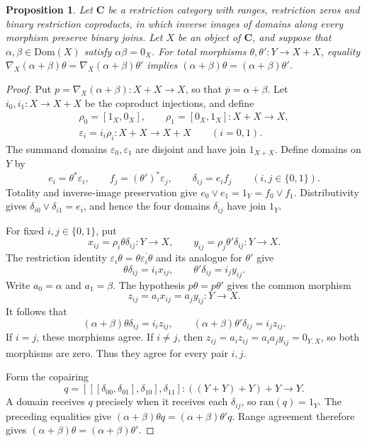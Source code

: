 \documentclass[letterpaper,10pt]{amsart}
\theoremstyle{plain}
\newtheorem{prop}{Proposition}[thm]
\theoremstyle{definition}
\newcommand{\rst}[1]{\overline{#1}}
\begin{document}
\begin{prop}\label{PropTotalCopMono}
Let $\mathbf C$ be a restriction category with ranges, restriction
zeros and binary restriction coproducts, in which inverse images of
domains along every morphism preserve binary joins. Let $X$ be an
object of $\mathbf C$, and suppose that $\alpha,\beta\in\mathrm{Dom}(X)$ satisfy $\alpha\beta=0_X$.
For total morphisms $\theta,\theta':Y\to X+X$, equality
$\nabla_X(\alpha+\beta)\theta=\nabla_X(\alpha+\beta)\theta'$
implies $(\alpha+\beta)\theta=(\alpha+\beta)\theta'$.
\end{prop}
\begin{proof}
Put $p=\nabla_X(\alpha+\beta):X+X\to X$, so that
$\rst p=\alpha+\beta$. Let $i_0,i_1:X\to X+X$ be the coproduct
injections, and define
\[
 \begin{gathered}
 \rho_0=[1_X,0_X],\qquad \rho_1=[0_X,1_X]:X+X\to X,\\
 \varepsilon_i=i_i\rho_i:X+X\to X+X\qquad(i=0,1).
 \end{gathered}
\]
The summand domains $\varepsilon_0,\varepsilon_1$ are disjoint
and have join $1_{X+X}$. Define domains on $Y$ by
\[
 e_i=\theta^*\varepsilon_i,\qquad
 f_j=(\theta')^*\varepsilon_j,\qquad
 \delta_{ij}=e_i f_j\qquad(i,j\in\{0,1\}).
\]
Totality and inverse-image preservation give
$e_0\vee e_1=1_Y=f_0\vee f_1$. Distributivity gives
$\delta_{i0}\vee\delta_{i1}=e_i$, and hence the four domains
$\delta_{ij}$ have join $1_Y$.

For fixed $i,j\in\{0,1\}$, put
\[
 x_{ij}=\rho_i\theta\delta_{ij}:Y\to X,
 \qquad y_{ij}=\rho_j\theta'\delta_{ij}:Y\to X.
\]
The restriction identity
$\varepsilon_i\theta=\theta\rst{\varepsilon_i\theta}$ and its
analogue for $\theta'$ give
\[
 \theta\delta_{ij}=i_i x_{ij},\qquad
 \theta'\delta_{ij}=i_j y_{ij}.
\]
Write $a_0=\alpha$ and $a_1=\beta$. The hypothesis $p\theta=p\theta'$
gives the common morphism
\[
 z_{ij}=a_i x_{ij}=a_j y_{ij}:Y\to X.
\]
It follows that
\[
 (\alpha+\beta)\theta\delta_{ij}=i_i z_{ij},\qquad
 (\alpha+\beta)\theta'\delta_{ij}=i_j z_{ij}.
\]
If $i=j$, these morphisms agree. If $i\ne j$, then
$z_{ij}=a_i z_{ij}=a_i a_j y_{ij}=0_{Y,X}$, so both morphisms
are zero. Thus they agree for every pair $i,j$.

Form the copairing
\[
 q=[[[\delta_{00},\delta_{01}],\delta_{10}],\delta_{11}]
       :((Y+Y)+Y)+Y\longrightarrow Y.
\]
A domain receives $q$ precisely when it receives each $\delta_{ij}$,
so $\mathrm{ran}(q)=1_Y$. The preceding equalities give
$(\alpha+\beta)\theta q=(\alpha+\beta)\theta' q$.
Range agreement therefore gives
$(\alpha+\beta)\theta=(\alpha+\beta)\theta'$.
\end{proof}
\end{document}
